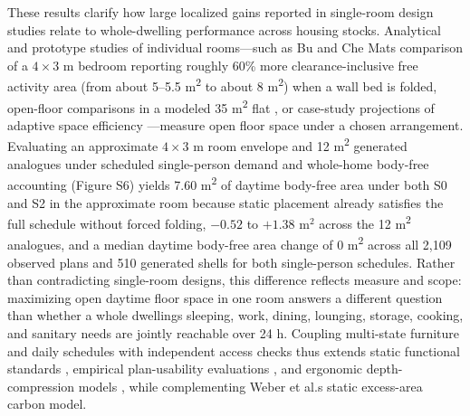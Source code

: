 \documentclass[12pt,letterpaper]{article}
\newcommand{\SubmissionCite}[1]{\unskip\citep{#1}}
\begin{document}
These results clarify how large localized gains reported in single-room design studies relate to whole-dwelling performance across housing stocks. Analytical and prototype studies of individual rooms---such as Bu and Che Mat\textquotesingle s \SubmissionCite{bu2026compact} comparison of a \(4 \times 3\text{ m}\) bedroom reporting roughly 60\% more clearance-inclusive free activity area (from about 5--5.5 m\textsuperscript{2} to about 8 m\textsuperscript{2}) when a wall bed is folded, open-floor comparisons in a modeled 35 m\textsuperscript{2} flat \SubmissionCite{elmurodov2026efficiency}, or case-study projections of adaptive space efficiency \SubmissionCite{goessler2023adaptive}---measure open floor space under a chosen arrangement. Evaluating an approximate \(4 \times 3\text{ m}\) room envelope and 12 m\textsuperscript{2} generated analogues under scheduled single-person demand and whole-home body-free accounting (Figure S6) yields 7.60 m\textsuperscript{2} of daytime body-free area under both S0 and S2 in the approximate room because static placement already satisfies the full schedule without forced folding, \(-0.52\) to \(+1.38\text{ m}^2\) across the 12 m\textsuperscript{2} analogues, and a median daytime body-free area change of 0 m\textsuperscript{2} across all 2,109 observed plans and 510 generated shells for both single-person schedules. Rather than contradicting single-room designs, this difference reflects measure and scope: maximizing open daytime floor space in one room answers a different question than whether a whole dwelling\textquotesingle s sleeping, work, dining, lounging, storage, cooking, and sanitary needs are jointly reachable over 24 h. Coupling multi-state furniture and daily schedules with independent access checks thus extends static functional standards \SubmissionCite{pedro2009dwellings,ulrich2025minimum}, empirical plan-usability evaluations \SubmissionCite{ozer2022dwelling,freimane2022riga,qaradaghi2022area,rakhmatillaeva2025spatial}, and ergonomic depth-compression models \SubmissionCite{zeng2026sbf}, while complementing Weber et al.\textquotesingle s \SubmissionCite{weber2024hypergraph} static excess-area carbon model.
\end{document}
